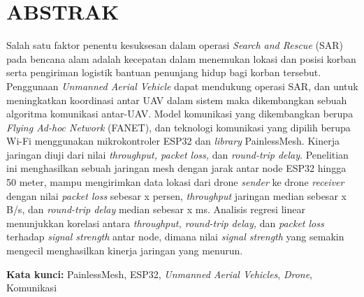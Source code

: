 \chapter*{ABSTRAK}

Salah satu faktor penentu kesuksesan dalam operasi \textit{Search and Rescue} (SAR) pada bencana alam adalah kecepatan dalam menemukan lokasi dan posisi korban serta pengiriman logistik bantuan penunjang hidup bagi korban tersebut. Penggunaan \textit{Unmanned Aerial Vehicle} dapat mendukung operasi SAR, dan untuk meningkatkan koordinasi antar UAV dalam sistem maka dikembangkan sebuah algoritma komunikasi antar-UAV. Model komunikasi yang dikembangkan berupa \textit{Flying Ad-hoc Network} (FANET), dan teknologi komunikasi yang dipilih berupa Wi-Fi menggunakan mikrokontroler ESP32 dan \textit{library} PainlessMesh. Kinerja jaringan diuji dari nilai \textit{throughput, packet loss,} dan \textit{round-trip delay}. Penelitian ini menghasilkan sebuah jaringan mesh dengan jarak antar node ESP32 hingga 50 meter, mampu mengirimkan data lokasi dari drone \textit{sender} ke drone \textit{receiver} dengan nilai \textit{packet loss} sebesar x persen, \textit{throughput} jaringan median sebesar x B/s, dan \textit{round-trip delay} median sebesar x ms. Analisis regresi linear menunjukkan korelasi antara \textit{throughput, round-trip delay,} dan \textit{packet loss} terhadap \textit{signal strength} antar node, dimana nilai \textit{signal strength} yang semakin mengecil menghasilkan kinerja jaringan yang menurun.

\vspace{2em}
\noindent \textbf{Kata kunci:} PainlessMesh, ESP32, \textit{Unmanned Aerial Vehicles}, \textit{Drone}, Komunikasi